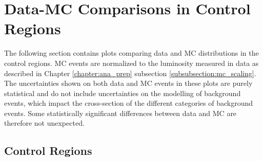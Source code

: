 \section{Data-MC Comparisons in Control Regions}
\label{section:datamc}
The following section contains plots comparing data and MC distributions in the control regions. MC events are normalized to the luminosity measured in data as described in Chapter \ref{chapter:ana_prep} subsection \ref{subsubsection:mc_scaling}. The uncertainties shown on both data and MC events in these plots are purely statistical and do not include uncertainties on the modelling of background events, which impact the cross-section of the different categories of background events. Some statistically significant differences between data and MC are therefore not unexpected.
\subsection{\ttbar Control Regions}

